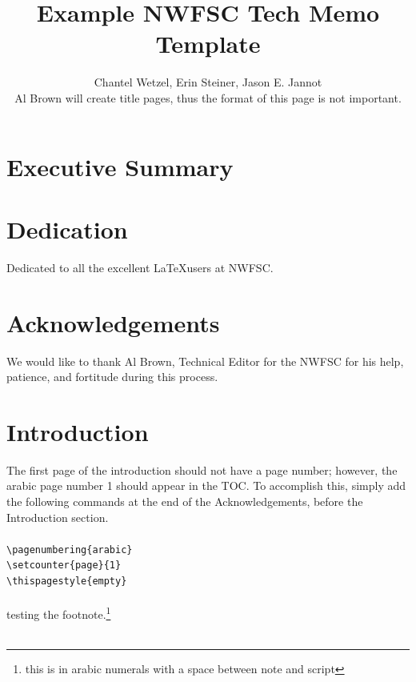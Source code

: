 \documentclass[12pt]{article}
\title{\textcolor[cmyk]{1.00,0.83,0.41,0.36}{Example NWFSC Tech Memo Template}}
\author{Chantel Wetzel, Erin Steiner, Jason E. Jannot\\
\small{Al Brown will create title pages, thus the format of this page is not important.}}
\begin{document}
\maketitle
\thispagestyle{empty}
\newpage
\normalfont %
\normalsize %
\setcounter{page}{3}     %
\tableofcontents
\newpage
\listoftables
\newpage
\listoffigures
\newpage
\section{Executive Summary}
\lipsum[1]
\lipsum[2]
\newpage
\section{Dedication}
Dedicated to all the excellent \LaTeX users at NWFSC.
\newpage
\section{Acknowledgements}
We would like to thank Al Brown, Technical Editor for the NWFSC for his help, patience, and fortitude during this process.
\newpage
{}
\setcounter{page}{1}
\thispagestyle{empty}	
\section{Introduction}
The first page of the introduction should not have a page number; however, the arabic page number 1 should appear in the TOC. To accomplish this, simply add the following commands at the end of the Acknowledgements, before the Introduction section.\\
\\
\texttt{\textbackslash pagenumbering\{arabic\}\\
	\textbackslash setcounter\{page\}\{1\}\\
	\textbackslash thispagestyle\{empty\}\\
}
\\
testing the footnote.\footnote{this is in arabic numerals with a space between note and script}\\
\\
\lipsum[3]
\end{document}

